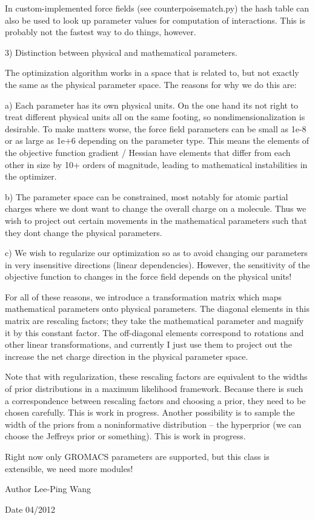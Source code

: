 In custom-\/implemented force fields (see counterpoisematch.\+py) the hash table can also be used to look up parameter values for computation of interactions. This is probably not the fastest way to do things, however.

3) Distinction between physical and mathematical parameters.

The optimization algorithm works in a space that is related to, but not exactly the same as the physical parameter space. The reasons for why we do this are\+:

a) Each parameter has its own physical units. On the one hand it\textquotesingle{}s not right to treat different physical units all on the same footing, so nondimensionalization is desirable. To make matters worse, the force field parameters can be small as 1e-\/8 or as large as 1e+6 depending on the parameter type. This means the elements of the objective function gradient / Hessian have elements that differ from each other in size by 10+ orders of magnitude, leading to mathematical instabilities in the optimizer.

b) The parameter space can be constrained, most notably for atomic partial charges where we don\textquotesingle{}t want to change the overall charge on a molecule. Thus we wish to project out certain movements in the mathematical parameters such that they don\textquotesingle{}t change the physical parameters.

c) We wish to regularize our optimization so as to avoid changing our parameters in very insensitive directions (linear dependencies). However, the sensitivity of the objective function to changes in the force field depends on the physical units!

For all of these reasons, we introduce a \textquotesingle{}transformation matrix\textquotesingle{} which maps mathematical parameters onto physical parameters. The diagonal elements in this matrix are rescaling factors; they take the mathematical parameter and magnify it by this constant factor. The off-\/diagonal elements correspond to rotations and other linear transformations, and currently I just use them to project out the \textquotesingle{}increase the net charge\textquotesingle{} direction in the physical parameter space.

Note that with regularization, these rescaling factors are equivalent to the widths of prior distributions in a maximum likelihood framework. Because there is such a correspondence between rescaling factors and choosing a prior, they need to be chosen carefully. This is work in progress. Another possibility is to sample the width of the priors from a noninformative distribution -- the hyperprior (we can choose the Jeffreys prior or something). This is work in progress.

Right now only G\+R\+O\+M\+A\+CS parameters are supported, but this class is extensible, we need more modules!

\begin{DoxyAuthor}{Author}
Lee-\/\+Ping Wang 
\end{DoxyAuthor}
\begin{DoxyDate}{Date}
04/2012 
\end{DoxyDate}
